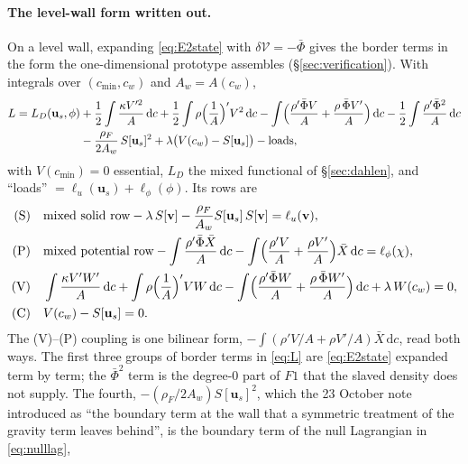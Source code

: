 \documentclass[11pt]{article}
\theoremstyle{definition}
\theoremstyle{remark}
\newcommand{\bu}{\mathbf{u}}
\newcommand{\bv}{\mathbf{v}}
\newcommand{\dc}{\,\mathrm{d}c}
\newcommand{\Vol}{\mathcal V}
\begin{document}
\paragraph{The level-wall form written out.} On a level wall, expanding
\eqref{eq:E2state} with $\delta\Vol = -\bar\Phi$ gives the border terms
in the form the one-dimensional prototype assembles
(\S\ref{sec:verification}). With integrals over $(c_{\min}, c_w)$ and
$A_w = A(c_w)$,
\begin{equation}
\begin{aligned}
  L = L_D(\bu_s,\phi)
  &+ \frac12\int\frac{\kappa V'^2}{A}\dc
   + \frac12\int\rho\Bigl(\frac1A\Bigr)'V^2\dc
   - \int\Bigl(\frac{\rho'\bar\Phi V}{A}
            + \frac{\rho\,\bar\Phi V'}{A}\Bigr)\dc
   - \frac12\int\frac{\rho'\bar\Phi^2}{A}\dc \\
  &- \frac{\rho_F}{2A_w}\,S[\bu_s]^2
   + \lambda\bigl(V(c_w) - S[\bu_s]\bigr) - \text{loads},
\end{aligned}
\label{eq:L}
\end{equation}
with $V(c_{\min}) = 0$ essential, $L_D$ the mixed functional of
\S\ref{sec:dahlen}, and ``loads'' $= \ell_u(\bu_s) + \ell_\phi(\phi)$.
Its rows are
\begin{equation}
\begin{aligned}
  \text{(S)}&\quad
  \text{mixed solid row} - \lambda\,S[\bv]
  - \frac{\rho_F}{A_w}S[\bu_s]\,S[\bv] = \ell_u(\bv),\\
  \text{(P)}&\quad
  \text{mixed potential row}
  - \int\frac{\rho'\bar\Phi\bar X}{A}\dc
  - \int\Bigl(\frac{\rho' V}{A} + \frac{\rho V'}{A}\Bigr)\bar X\dc
  = \ell_\phi(\chi),\\
  \text{(V)}&\quad
  \int\frac{\kappa V'W'}{A}\dc + \int\rho\Bigl(\frac1A\Bigr)'VW\dc
  - \int\Bigl(\frac{\rho'\bar\Phi W}{A} + \frac{\rho\,\bar\Phi W'}{A}\Bigr)\dc
  + \lambda\,W(c_w) = 0,\\
  \text{(C)}&\quad V(c_w) - S[\bu_s] = 0 .
\end{aligned}
\label{eq:rows}
\end{equation}
The (V)--(P) coupling is one bilinear form, $-\int(\rho' V/A + \rho
V'/A)\bar X\dc$, read both ways. The first three groups of border terms
in \eqref{eq:L} are \eqref{eq:E2state} expanded term by term; the
$\bar\Phi^2$ term is the degree-0 part of $F1$ that the slaved density
does not supply. The fourth, $-(\rho_F/2A_w)S[\bu_s]^2$, which the 23
October note introduced as ``the boundary term at the wall that a
symmetric treatment of the gravity term leaves behind'', is the
boundary term of the null Lagrangian in \eqref{eq:nulllag},
\end{document}
